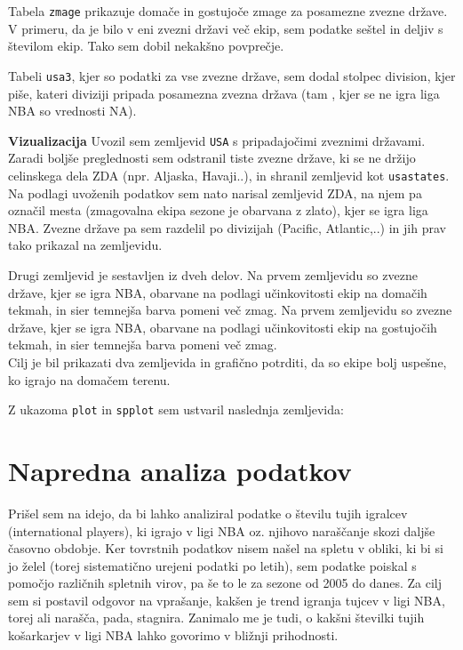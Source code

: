 \documentclass[11pt,a4paper]{article}
\begin{document}
\smallskip

Tabela \verb|zmage| prikazuje domače in gostujoče zmage za posamezne zvezne države. V primeru, da je bilo v eni zvezni državi več ekip, sem podatke seštel in deljiv s številom ekip. Tako sem dobil nekakšno povprečje.
\smallskip

Tabeli \verb|usa3|, kjer so podatki za vse zvezne države, sem dodal stolpec division, kjer piše, kateri diviziji pripada posamezna zvezna država (tam , kjer se ne igra liga NBA so vrednosti NA).
\smallskip

\textbf{Vizualizacija}
\newline
Uvozil sem zemljevid \verb|USA| s pripadajočimi zveznimi državami. Zaradi boljše preglednosti sem odstranil tiste zvezne države, ki se ne držijo celinskega dela ZDA (npr. Aljaska, Havaji..), in shranil zemljevid kot \verb|usastates|. Na podlagi uvoženih podatkov sem nato narisal zemljevid ZDA, na njem pa označil mesta (zmagovalna ekipa sezone je obarvana z zlato), kjer se igra liga NBA. Zvezne države pa sem razdelil po divizijah (Pacific, Atlantic,..) in jih prav tako prikazal na zemljevidu.
\smallskip


Drugi zemljevid je sestavljen iz dveh delov. 
Na prvem zemljevidu so zvezne države, kjer se igra NBA, obarvane na podlagi učinkovitosti ekip na domačih tekmah, in sier temnejša barva pomeni več zmag.
Na prvem zemljevidu so zvezne države, kjer se igra NBA, obarvane na podlagi učinkovitosti ekip na gostujočih tekmah, in sier temnejša barva pomeni več zmag.\\
Cilj je bil prikazati dva zemljevida in grafično potrditi, da so ekipe bolj uspešne, ko igrajo na domačem terenu.

Z ukazoma \verb|plot| in \verb|spplot| sem ustvaril naslednja zemljevida:






\section{Napredna analiza podatkov}

Prišel sem na idejo, da bi lahko analiziral podatke o številu tujih igralcev (international players), ki igrajo v ligi NBA oz. njihovo naraščanje skozi daljše časovno obdobje. Ker tovrstnih podatkov nisem našel na spletu v obliki, ki bi si jo želel (torej sistematično urejeni podatki po letih), sem podatke poiskal s pomočjo različnih spletnih virov, pa še to le za sezone od 2005 do danes. Za cilj sem si postavil odgovor na vprašanje, kakšen je trend igranja tujcev v ligi NBA, torej ali narašča, pada, stagnira. Zanimalo me je tudi, o kakšni številki tujih košarkarjev v ligi NBA lahko govorimo v bližnji prihodnosti.
\smallskip
\end{document}
